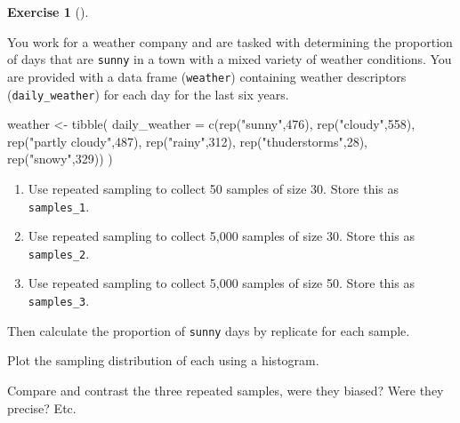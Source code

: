 \documentclass[
  letterpaper,
  DIV=11,
  numbers=noendperiod]{scrreprt}
\newenvironment{Shaded}{\begin{snugshade}}{\end{snugshade}}
\newcommand{\AttributeTok}[1]{\textcolor[rgb]{0.40,0.45,0.13}{#1}}
\newcommand{\DecValTok}[1]{\textcolor[rgb]{0.68,0.00,0.00}{#1}}
\newcommand{\FunctionTok}[1]{\textcolor[rgb]{0.28,0.35,0.67}{#1}}
\newcommand{\NormalTok}[1]{\textcolor[rgb]{0.00,0.23,0.31}{#1}}
\newcommand{\OtherTok}[1]{\textcolor[rgb]{0.00,0.23,0.31}{#1}}
\newcommand{\StringTok}[1]{\textcolor[rgb]{0.13,0.47,0.30}{#1}}
\providecommand{\tightlist}{%
  \setlength{\itemsep}{0pt}\setlength{\parskip}{0pt}}\usepackage{longtable,booktabs,array}
\theoremstyle{definition}
\newtheorem{exercise}{Exercise}[chapter]
\theoremstyle{remark}
\begin{document}
\begin{exercise}[]\protect\hypertarget{exr-ch09-adv1}{}\label{exr-ch09-adv1}

You work for a weather company and are tasked with determining the
proportion of days that are \texttt{sunny} in a town with a mixed
variety of weather conditions. You are provided with a data frame
(\texttt{weather}) containing weather descriptors
(\texttt{daily\_weather}) for each day for the last six years.

\begin{Shaded}
\begin{Highlighting}[]
\NormalTok{weather }\OtherTok{\textless{}{-}} \FunctionTok{tibble}\NormalTok{(}
  \AttributeTok{daily\_weather =} \FunctionTok{c}\NormalTok{(}\FunctionTok{rep}\NormalTok{(}\StringTok{"sunny"}\NormalTok{,}\DecValTok{476}\NormalTok{), }
                    \FunctionTok{rep}\NormalTok{(}\StringTok{"cloudy"}\NormalTok{,}\DecValTok{558}\NormalTok{), }
                    \FunctionTok{rep}\NormalTok{(}\StringTok{"partly cloudy"}\NormalTok{,}\DecValTok{487}\NormalTok{), }
                    \FunctionTok{rep}\NormalTok{(}\StringTok{"rainy"}\NormalTok{,}\DecValTok{312}\NormalTok{), }
                    \FunctionTok{rep}\NormalTok{(}\StringTok{"thuderstorms"}\NormalTok{,}\DecValTok{28}\NormalTok{), }
                    \FunctionTok{rep}\NormalTok{(}\StringTok{"snowy"}\NormalTok{,}\DecValTok{329}\NormalTok{))}
\NormalTok{  )}
\end{Highlighting}
\end{Shaded}

\begin{enumerate}
\def\labelenumi{\alph{enumi})}
\tightlist
\item
  Use repeated sampling to collect 50 samples of size 30. Store this as
  \texttt{samples\_1}.
\item
  Use repeated sampling to collect 5,000 samples of size 30. Store this
  as \texttt{samples\_2}.
\item
  Use repeated sampling to collect 5,000 samples of size 50. Store this
  as \texttt{samples\_3}.
\end{enumerate}

Then calculate the proportion of \texttt{sunny} days by replicate for
each sample.

Plot the sampling distribution of each using a histogram.

Compare and contrast the three repeated samples, were they biased? Were
they precise? Etc.

\end{exercise}
\end{document}

